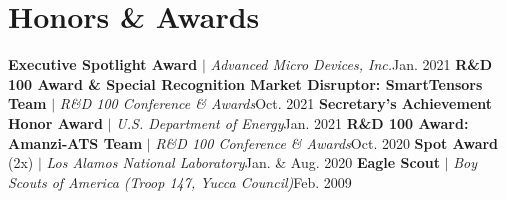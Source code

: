\section{Honors \& Awards}
    \resumeSubHeadingListStart
      \resumeProjectHeading
          {\textbf{Executive Spotlight Award} $|$ \emph{Advanced Micro Devices, Inc.}}{Jan. 2021}
      \resumeProjectHeading
          {\textbf{R\&D 100 Award \& Special Recognition Market Disruptor: SmartTensors Team} $|$ \emph{R\&D 100 Conference \& Awards}}{Oct. 2021}
      \resumeProjectHeading
          {\textbf{Secretary's Achievement Honor Award} $|$ \emph{U.S. Department of Energy}}{Jan. 2021}
      \resumeProjectHeading
          {\textbf{R\&D 100 Award: Amanzi-ATS Team} $|$ \emph{R\&D 100 Conference \& Awards}}{Oct. 2020}
      \resumeProjectHeading
          {\textbf{Spot Award} (2x) $|$ \emph{Los Alamos National Laboratory}}{Jan. \& Aug. 2020}
      \resumeProjectHeading
          {\textbf{Eagle Scout} $|$ \emph{Boy Scouts of America (Troop 147, Yucca Council)}}{Feb. 2009}
    \resumeSubHeadingListEnd
